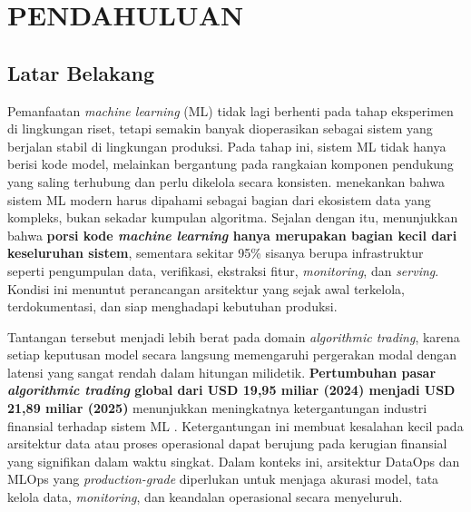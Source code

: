 \chapter{PENDAHULUAN}
\label{chap:pendahuluan}

\section{Latar Belakang}

Pemanfaatan \textit{machine learning} (ML) tidak lagi berhenti pada tahap eksperimen di lingkungan riset, tetapi semakin banyak dioperasikan sebagai sistem yang berjalan stabil di lingkungan produksi. Pada tahap ini, sistem ML tidak hanya berisi kode model, melainkan bergantung pada rangkaian komponen pendukung yang saling terhubung dan perlu dikelola secara konsisten. \textcite{polyzotis2018data} menekankan bahwa sistem ML modern harus dipahami sebagai bagian dari ekosistem data yang kompleks, bukan sekadar kumpulan algoritma. Sejalan dengan itu, \textcite{sculley2015hidden} menunjukkan bahwa \textbf{porsi kode \textit{machine learning} hanya merupakan bagian kecil dari keseluruhan sistem}, sementara sekitar 95\% sisanya berupa infrastruktur seperti pengumpulan data, verifikasi, ekstraksi fitur, \textit{monitoring}, dan \textit{serving}. Kondisi ini menuntut perancangan arsitektur yang sejak awal terkelola, terdokumentasi, dan siap menghadapi kebutuhan produksi.

Tantangan tersebut menjadi lebih berat pada domain \textit{algorithmic trading}, karena setiap keputusan model secara langsung memengaruhi pergerakan modal dengan latensi yang sangat rendah dalam hitungan milidetik. \textbf{Pertumbuhan pasar \textit{algorithmic trading} global dari USD 19{,}95 miliar (2024) menjadi USD 21{,}89 miliar (2025)} menunjukkan meningkatnya ketergantungan industri finansial terhadap sistem ML \autocite{business2025algorithmic}. Ketergantungan ini membuat kesalahan kecil pada arsitektur data atau proses operasional dapat berujung pada kerugian finansial yang signifikan dalam waktu singkat. Dalam konteks ini, arsitektur DataOps dan MLOps yang \textit{production-grade} diperlukan untuk menjaga akurasi model, tata kelola data, \textit{monitoring}, dan keandalan operasional secara menyeluruh.

